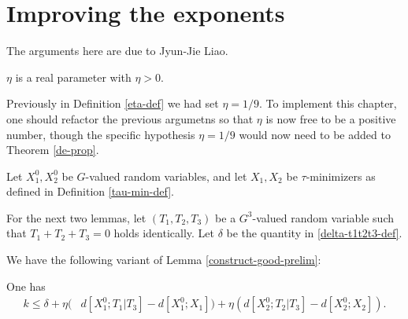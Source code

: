 \chapter{Improving the exponents}

The arguments here are due to Jyun-Jie Liao.

\begin{definition}\label{eta-def-new}\leanok  $\eta$ is a real parameter with $\eta > 0$.
\end{definition}

Previously in Definition \ref{eta-def} we had set $\eta=1/9$.  To implement this chapter, one should refactor the previous argumetns so that $\eta$ is now free to be a positive number, though the specific hypothesis $\eta=1/9$ would now need to be added to Theorem \ref{de-prop}.

Let $X^0_1, X^0_2$ be $G$-valued random variables, and let $X_1, X_2$ be $\tau$-minimizers as defined in Definition \ref{tau-min-def}.

For the next two lemmas, let $(T_1,T_2,T_3)$ be a $G^3$-valued random variable such that $T_1+T_2+T_3=0$ holds identically. Let $\delta$ be the quantity in \eqref{delta-t1t2t3-def}.

We have the following variant of Lemma \ref{construct-good-prelim}:

\begin{lemma}\label{construct-good-prelim'}
  One has
  \begin{align*}  k \leq
    \delta + \eta (& d[X^0_1;T_1|T_3]-d[X^0_1;X_1])
      + \eta (d[X^0_2;T_2|T_3]-d[X^0_2;X_2]).
  \end{align*}
\end{lemma}

